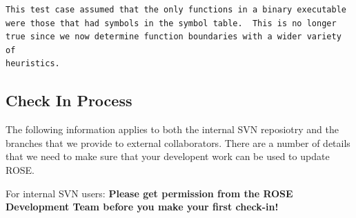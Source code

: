 \begin{enumerate}
{\begin{verbatim}
This test case assumed that the only functions in a binary executable
were those that had symbols in the symbol table.  This is no longer
true since we now determine function boundaries with a wider variety of
heuristics.
	       \end{verbatim} 
            }
\end{enumerate}


\subsection{Check In Process}

   The following information applies to both the internal SVN reposiotry and the 
branches that we provide to external collaborators.  There are a number of details
that we need to make sure that your developent work can be used to update ROSE.

For internal SVN users:
{\bf Please get permission from the ROSE Development Team before you make your first check-in!}

